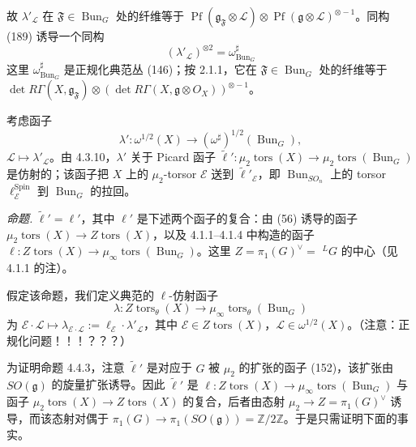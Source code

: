 
故 $\lambda'_{\mathcal{L}}$ 在 $\mathfrak{F}\in\operatorname{Bun}_{G}$ 处的纤维等于 $\operatorname{Pf}(\mathfrak{g}_{\mathfrak{F}}\otimes\mathcal{L})\otimes\operatorname{Pf}(\mathfrak{g}\otimes\mathcal{L})^{\otimes-1}$。同构 (189) 诱导一个同构
\begin{equation}\tag{209}
(\lambda'_{\mathcal{L}})^{\otimes 2}=\omega^{\sharp}_{\operatorname{Bun}_{G}}
\end{equation}
这里 $\omega^{\sharp}_{\operatorname{Bun}_{G}}$ 是正规化典范丛 (146)；按 2.1.1，它在 $\mathfrak{F}\in\operatorname{Bun}_{G}$ 处的纤维等于 $\det R\Gamma(X,\mathfrak{g}_{\mathfrak{F}})\otimes(\det R\Gamma(X,\mathfrak{g}\otimes O_{X}))^{\otimes-1}$。

 考虑函子
\begin{equation}\tag{210}
\lambda':\omega^{1/2}(X)\to(\omega^{\sharp})^{1/2}(\operatorname{Bun}_{G}),
\end{equation}
$\mathcal{L}\mapsto\lambda'_{\mathcal{L}}$。由 4.3.10，$\lambda'$ 关于 Picard 函子 $\tilde\ell':\mu_{2}\operatorname{tors}(X)\to\mu_{2}\operatorname{tors}(\operatorname{Bun}_{G})$ 是仿射的；该函子把 $X$ 上的 $\mu_{2}$-torsor $\mathcal{E}$ 送到 $\tilde\ell'_{\mathcal{E}}$，即 $\operatorname{Bun}_{SO_{n}}$ 上的 torsor $\ell^{\operatorname{Spin}}_{\mathcal{E}}$ 到 $\operatorname{Bun}_{G}$ 的拉回。

 \emph{命题.} $\tilde\ell'=\ell'$，其中 $\ell'$ 是下述两个函子的复合：由 (56) 诱导的函子 $\mu_{2}\operatorname{tors}(X)\to Z\operatorname{tors}(X)$，以及 4.1.1–4.1.4 中构造的函子 $\ell:Z\operatorname{tors}(X)\to\mu_{\infty}\operatorname{tors}(\operatorname{Bun}_{G})$。这里 $Z=\pi_{1}(G)^{\vee}=$ ${}^{L}G$ 的中心（见 4.1.1 的注）。

假定该命题，我们定义典范的 $\ell$-仿射函子
\begin{equation}\tag{211}
\lambda:Z\operatorname{tors}_{\theta}(X)\to\mu_{\infty}\operatorname{tors}_{\theta}(\operatorname{Bun}_{G})
\end{equation}
为 $\mathcal{E}\cdot\mathcal{L}\mapsto\lambda_{\mathcal{E}\cdot\mathcal{L}}:=\ell_{\mathcal{E}}\cdot\lambda'_{\mathcal{L}}$，其中 $\mathcal{E}\in Z\operatorname{tors}(X)$，$\mathcal{L}\in\omega^{1/2}(X)$。（注意：正规化问题！！！？？？）

为证明命题 4.4.3，注意 $\tilde\ell'$ 是对应于 $G$ 被 $\mu_{2}$ 的扩张的函子 (152)，该扩张由 $SO(\mathfrak{g})$ 的旋量扩张诱导。因此 $\tilde\ell'$ 是 $\ell:Z\operatorname{tors}(X)\to\mu_{\infty}\operatorname{tors}(\operatorname{Bun}_{G})$ 与函子 $\mu_{2}\operatorname{tors}(X)\to Z\operatorname{tors}(X)$ 的复合，后者由态射 $\mu_{2}\to Z=\pi_{1}(G)^{\vee}$ 诱导，而该态射对偶于 $\pi_{1}(G)\to\pi_{1}(SO(\mathfrak{g}))=\mathbb{Z}/2\mathbb{Z}$。于是只需证明下面的事实。

